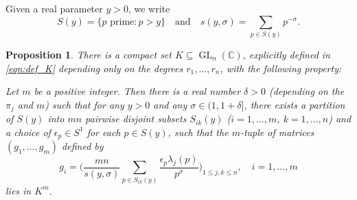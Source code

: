 \documentclass[11pt]{amsart}
\newtheorem{proposition}[theorem]{Proposition}
\theoremstyle{remark}
\numberwithin{theorem}{section}
\numberwithin{equation}{section}
\newcommand{\C}{\mathbb{C}}
\DeclareMathOperator{\GL}{GL}
\begin{document}
Given a real parameter $y>0$, we write
\[
S(y) = \{p \text{ prime}: p > y \}
\quad\text{and}\quad
s(y,\sigma) = \sum_{p\in S(y)} p^{-\sigma}.
\]

\begin{proposition}\label{prop:sw1}
There is a compact set $K \subseteq \GL_n(\C)$, explicitly defined in \eqref{eqn:def_K}
depending only on the
degrees $r_1,\ldots,r_n$, with the following property:

Let $m$ be a positive integer. Then there is a real number
$\delta>0$ (depending on the $\pi_j$ and $m$) such that for any $y>0$
and any $\sigma\in(1,1+\delta]$,
there exists a partition of $S(y)$ into $mn$ pairwise disjoint subsets
$S_{ik}(y)$ ($i=1,\ldots,m$, $k=1,\ldots,n$)
and a choice of $\epsilon_p \in S^1$ for each $p\in S(y)$, such that the
$m$-tuple of matrices $(g_1,\ldots,g_m)$ defined by
\begin{equation}\label{eqn:gidef}
g_i = \bigg( \frac{mn}{s(y,\sigma)} \sum_{p \in S_{ik}(y)}
\frac{ \epsilon_p \lambda_j(p)}{p^{\sigma}} \bigg)_{1 \leq j, k \leq n},
\quad i=1,\ldots,m
\end{equation}
lies in $K^m$.
\end{proposition}
\end{document}
